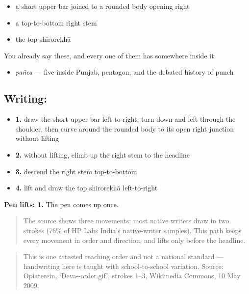 \begin{itemize}
\raggedright
  \item a short upper bar joined to a rounded body opening right
  \item a top-to-bottom right stem
  \item the top shirorekhā
\end{itemize}

You already say these, and every one of them has  somewhere inside it:

\begin{itemize}
\raggedright
  \item \textbf{} \emph{pañca} — five inside Punjab, pentagon, and the debated history of punch
\end{itemize}

\subsection*{Writing: }

\begin{itemize}
\raggedright
  \item \textbf{1.} draw the short upper bar left-to-right, turn down and left through the shoulder, then curve around the rounded body to its open right junction without lifting
  \item \textbf{2.} without lifting, climb up the right stem to the headline
  \item \textbf{3.} descend the right stem top-to-bottom
  \item \textbf{4.} lift and draw the top shirorekhā left-to-right
\end{itemize}

\textbf{Pen lifts: 1.} The pen comes up once.

\begin{quote}
The source shows three movements; most native writers draw  in two strokes (76\% of HP Labs India's native-writer samples). This path keeps every movement in order and direction, and lifts only before the headline.
\end{quote}

\begin{quote}
This is one attested teaching order and not a national standard — handwriting here is taught with school-to-school variation. Source: Opiaterein, ‘Deva--order.gif’, strokes 1–3, Wikimedia Commons, 10 May 2009.
\end{quote}

